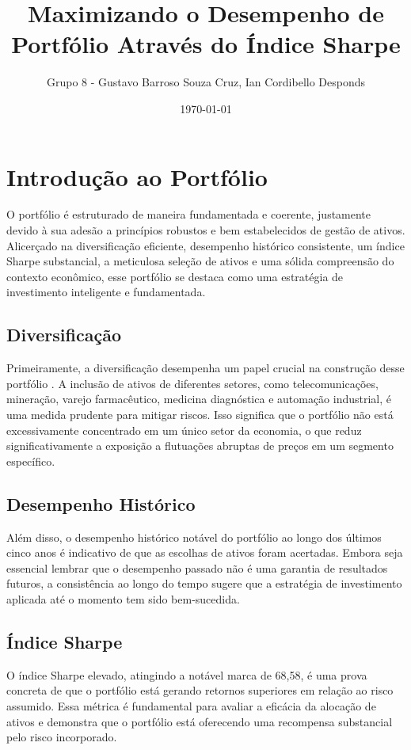 \documentclass{article}
\title{\textbf{Maximizando o Desempenho de Portfólio Através do Índice Sharpe}}
\author{Grupo 8 - Gustavo Barroso Souza Cruz, Ian Cordibello Desponds}
\date{\today}
\begin{document}
    \maketitle
    \section*{Introdução ao Portfólio}
    
    O portfólio é estruturado de maneira fundamentada e coerente, justamente devido à sua adesão
     a princípios robustos e bem estabelecidos de gestão de ativos. Alicerçado na diversificação 
     eficiente, desempenho histórico consistente, um índice Sharpe substancial, a meticulosa 
     seleção de ativos e uma sólida compreensão do contexto econômico, 
    esse portfólio se destaca como uma estratégia de investimento inteligente e fundamentada.

    \subsection*{Diversificação}
    
    Primeiramente, a diversificação desempenha um papel crucial na construção desse portfólio
    . A inclusão de ativos de diferentes setores, como telecomunicações, mineração, varejo
     farmacêutico, medicina diagnóstica e automação industrial, é uma medida prudente para mitigar 
     riscos. Isso significa que o portfólio não está excessivamente concentrado em um único setor da economia, o que 
    reduz significativamente a exposição a flutuações abruptas de preços em um segmento específico.

    \subsection*{Desempenho Histórico}

    Além disso, o desempenho histórico notável do portfólio ao longo dos últimos cinco anos é indicativo de que as escolhas de 
    ativos foram acertadas. Embora seja essencial lembrar que o desempenho passado não é uma garantia de resultados futuros, a 
    consistência ao longo do tempo sugere que a estratégia de investimento aplicada até o momento tem sido bem-sucedida.

    \subsection*{Índice Sharpe}

    O índice Sharpe elevado, atingindo a notável marca de 68,58, é uma prova concreta de que o portfólio está gerando retornos 
    superiores em relação ao risco assumido. Essa métrica é fundamental para avaliar a eficácia da alocação de ativos e demonstra 
    que o portfólio está oferecendo uma recompensa substancial pelo risco incorporado.
\end{document}
